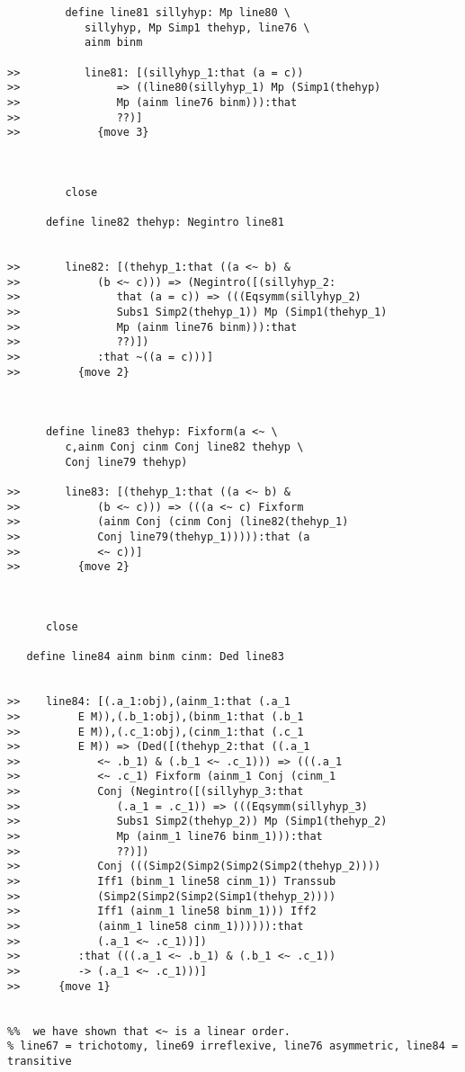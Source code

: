 \documentclass[12pt]{article}
\begin{document}
\begin{verbatim}
         define line81 sillyhyp: Mp line80 \
            sillyhyp, Mp Simp1 thehyp, line76 \
            ainm binm

>>          line81: [(sillyhyp_1:that (a = c))
>>               => ((line80(sillyhyp_1) Mp (Simp1(thehyp)
>>               Mp (ainm line76 binm))):that
>>               ??)]
>>            {move 3}



         close

      define line82 thehyp: Negintro line81


>>       line82: [(thehyp_1:that ((a <~ b) &
>>            (b <~ c))) => (Negintro([(sillyhyp_2:
>>               that (a = c)) => (((Eqsymm(sillyhyp_2)
>>               Subs1 Simp2(thehyp_1)) Mp (Simp1(thehyp_1)
>>               Mp (ainm line76 binm))):that
>>               ??)])
>>            :that ~((a = c)))]
>>         {move 2}



      define line83 thehyp: Fixform(a <~ \
         c,ainm Conj cinm Conj line82 thehyp \
         Conj line79 thehyp)

>>       line83: [(thehyp_1:that ((a <~ b) &
>>            (b <~ c))) => (((a <~ c) Fixform
>>            (ainm Conj (cinm Conj (line82(thehyp_1)
>>            Conj line79(thehyp_1))))):that (a
>>            <~ c))]
>>         {move 2}



      close

   define line84 ainm binm cinm: Ded line83


>>    line84: [(.a_1:obj),(ainm_1:that (.a_1
>>         E M)),(.b_1:obj),(binm_1:that (.b_1
>>         E M)),(.c_1:obj),(cinm_1:that (.c_1
>>         E M)) => (Ded([(thehyp_2:that ((.a_1
>>            <~ .b_1) & (.b_1 <~ .c_1))) => (((.a_1
>>            <~ .c_1) Fixform (ainm_1 Conj (cinm_1
>>            Conj (Negintro([(sillyhyp_3:that
>>               (.a_1 = .c_1)) => (((Eqsymm(sillyhyp_3)
>>               Subs1 Simp2(thehyp_2)) Mp (Simp1(thehyp_2)
>>               Mp (ainm_1 line76 binm_1))):that
>>               ??)])
>>            Conj (((Simp2(Simp2(Simp2(Simp2(thehyp_2))))
>>            Iff1 (binm_1 line58 cinm_1)) Transsub
>>            (Simp2(Simp2(Simp2(Simp1(thehyp_2))))
>>            Iff1 (ainm_1 line58 binm_1))) Iff2
>>            (ainm_1 line58 cinm_1)))))):that
>>            (.a_1 <~ .c_1))])
>>         :that (((.a_1 <~ .b_1) & (.b_1 <~ .c_1))
>>         -> (.a_1 <~ .c_1)))]
>>      {move 1}


%%  we have shown that <~ is a linear order. 
% line67 = trichotomy, line69 irreflexive, line76 asymmetric, line84 = transitive


\end{verbatim}
\end{document}
